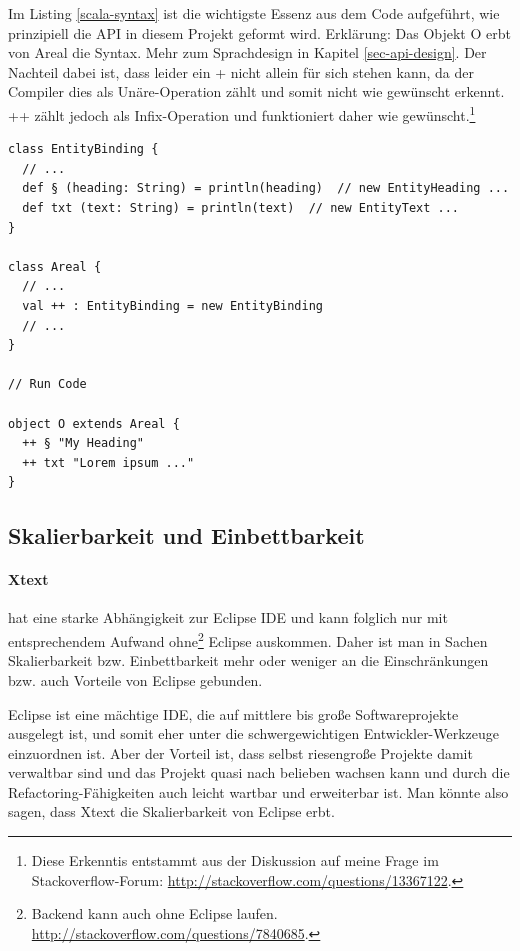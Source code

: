 Im Listing \ref{scala-syntax} ist die wichtigste Essenz aus dem Code
aufgeführt, wie prinzipiell die API in diesem Projekt geformt wird.
Erklärung: Das Objekt O erbt von Areal die Syntax.
Mehr zum Sprachdesign in Kapitel \ref{sec-api-design}.
Der Nachteil dabei ist,
dass leider ein + nicht allein für sich stehen kann, da der Compiler dies
als Unäre-Operation zählt und somit nicht wie gewünscht erkennt. ++ zählt jedoch
als Infix-Operation und funktioniert daher wie gewünscht.\footnote{
Diese Erkenntis entstammt aus der Diskussion auf meine Frage im Stackoverflow-Forum:
\url{http://stackoverflow.com/questions/13367122}.}

\begin{lstlisting}[label=scala-syntax,caption=Scala DSL Syntax und Bindung an API.]
class EntityBinding {
  // ...
  def § (heading: String) = println(heading)  // new EntityHeading ...
  def txt (text: String) = println(text)  // new EntityText ...
}

class Areal {
  // ...
  val ++ : EntityBinding = new EntityBinding
  // ...
}

// Run Code

object O extends Areal {
  ++ § "My Heading"
  ++ txt "Lorem ipsum ..."
}
\end{lstlisting}

\subsection{Skalierbarkeit und Einbettbarkeit}\label{sec-scalierEinbett}

\paragraph{Xtext} hat eine starke Abhängigkeit
zur Eclipse IDE und kann folglich nur mit entsprechendem Aufwand
ohne\footnote{ Backend kann auch ohne Eclipse laufen.
\url{http://stackoverflow.com/questions/7840685}.}
Eclipse auskommen. Daher ist man in Sachen Skalierbarkeit bzw. Einbettbarkeit
mehr oder weniger an die Einschränkungen bzw. auch Vorteile von Eclipse gebunden.

Eclipse ist eine mächtige IDE, die auf mittlere bis große Softwareprojekte
ausgelegt ist, und somit eher unter die schwergewichtigen Entwickler-Werkzeuge
einzuordnen ist. Aber der Vorteil ist, dass selbst riesengroße Projekte
damit verwaltbar sind und das Projekt quasi nach belieben wachsen kann und
durch die Refactoring-Fähigkeiten auch leicht wartbar und erweiterbar ist.
Man könnte also sagen, dass Xtext die Skalierbarkeit von Eclipse erbt.

